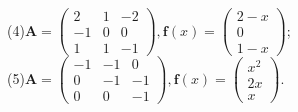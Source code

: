 \documentclass[titlepage,11pt,a4paper,twoside]{report}
\begin{document}
(4)$\bm{A}=\begin{pmatrix}2&1&-2\\-1&0&0\\1&1&-1\end{pmatrix},\bm{f}(x)=\begin{pmatrix}2-x\\0\\1-x\end{pmatrix}$;\\
(5)$\bm{A}=\begin{pmatrix}-1&-1&0\\0&-1&-1\\0&0&-1\end{pmatrix},\bm{f}(x)=\begin{pmatrix}x^2\\2x\\x\end{pmatrix}$.
\end{document}
